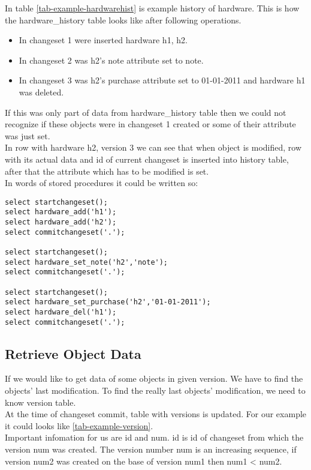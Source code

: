 \documentclass[deska]{subfiles}
\begin{document}
In table \ref{tab-example-hardwarehist} is example history of hardware. This is how the hardware\_history table looks like after following operations. 
\begin{itemize}
    \item In changeset 1 were inserted hardware h1, h2.
    \item In changeset 2 was h2's note attribute set to note.
    \item In changeset 3 was h2's purchase attribute set to 01-01-2011 and hardware h1 was deleted.
\end{itemize}


If this was only part of data from hardware\_history table then we could not recognize if these objects were in changeset 1 created or some of their attribute was just set.\\
In row with hardware h2, version 3 we can see that when object is modified, row with its actual data and id of current changeset is inserted into history table, after that the attribute which has to be modified is set.\\
In words of stored procedures it could be written so:\\

\begin{verbatim}
select startchangeset();
select hardware_add('h1');
select hardware_add('h2');
select commitchangeset('.');

select startchangeset();
select hardware_set_note('h2','note');
select commitchangeset('.');

select startchangeset();
select hardware_set_purchase('h2','01-01-2011');
select hardware_del('h1');
select commitchangeset('.');
\end{verbatim}

\subsection{Retrieve Object Data}

If we would like to get data of some objects in given version. We have to find the objects' last modification. To find the really last objects' modification, we need to know version table.\\
At the time of changeset commit, table with versions is updated. For our example it could looks like \ref{tab-example-version}.\\
Important infomation for us are id and num. id is id of changeset from which the version num was created. The version number num is an increasing sequence, if version num2 was created on the base of version num1 then num1 < num2.
\end{document}
